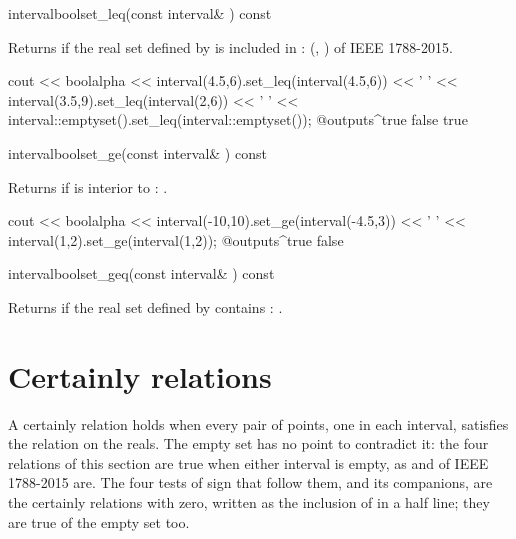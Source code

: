 \documentclass[12pt,a4paper,twoside,openright]{book}
\begin{document}
\begin{defmethod}{interval}{bool}{set\_leq}{(const interval\& ) const}
  \begin{operation}
  \end{operation}
  Returns  if the real set defined by  is included in
  : (, ) of IEEE 1788-2015.
\begin{example}
cout << boolalpha << interval(4.5,6).set_leq(interval(4.5,6)) << ' '
     << interval(3.5,9).set_leq(interval(2,6)) << ' '
     << interval::emptyset().set_leq(interval::emptyset());
@outputs^true false true~
\end{example}
\end{defmethod}

\begin{defmethod}{interval}{bool}{set\_ge}{(const interval\& ) const}
  \begin{operation}
  \end{operation}
  Returns  if  is interior to :
  .
\begin{example}
cout << boolalpha << interval(-10,10).set_ge(interval(-4.5,3)) << ' '
     << interval(1,2).set_ge(interval(1,2));
@outputs^true false~
\end{example}
\end{defmethod}

\begin{defmethod}{interval}{bool}{set\_geq}{(const interval\& ) const}
  \begin{operation}
  \end{operation}
  Returns  if the real set defined by  contains
  : .
\end{defmethod}

\section{Certainly relations}\label{sec:relations-certainly}

A certainly relation holds when every pair of points, one in each interval,
satisfies the relation on the reals. The empty set has no point to
contradict it: the four relations of this section are true when either
interval is empty, as  and  of
IEEE 1788-2015 are.\newinvfive{} The four tests of sign that follow them,
 and its companions, are the certainly relations
with zero, written as the inclusion of  in a half line; they are
true of the empty set too.
\end{document}
